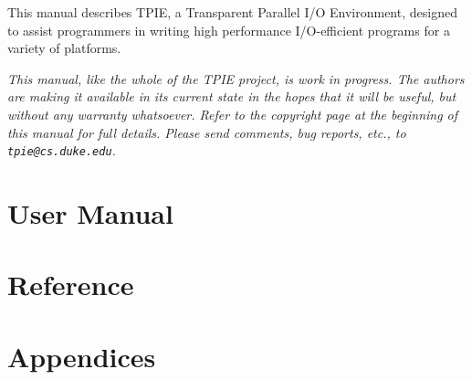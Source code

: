 \documentclass[10pt]{book}
\begin{document}
This manual describes TPIE, a Transparent Parallel I/O
Environment, designed to assist programmers in writing high
performance I/O-efficient programs for a variety of
platforms.

{ \em This manual, like the whole of the TPIE project, is work in
  progress. The authors are making it available in its current state
  in the hopes that it will be useful, but without any warranty
  whatsoever. Refer to the copyright page at the beginning of this
  manual for full details. Please send comments, bug reports, etc., to
  \verb|tpie@cs.duke.edu|.}


\part{User Manual}
  

\part{Reference}
\part{Appendices}
\appendix
  
  
  


\newpage
{}

\newpage
{}
\printindex
\end{document}
